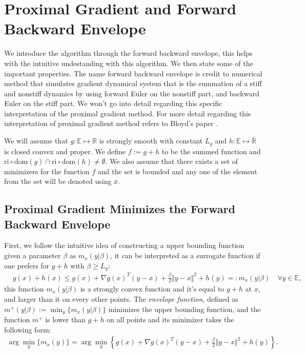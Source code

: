 \documentclass[]{article}
\theoremstyle{definition}
\begin{document}
\section{Proximal Gradient and Forward Backward Envelope}\label{sec:pg_forward_backward_env}
    We introduce the algorithm through the forward backward envelope, this helps with the intuitive undestanding with this algorithm. We then state some of the important properties. The name forward backward envelope is credit to numerical method that simulates gradient dynamical system that is the summation of a stiff and nonstiff dynamics by using forward Euler on the nonstiff part, and backward Euler on the stiff part. We won't go into detail regarding this specific interpretation of the proximal gradient method. For more detail regarding this interpretation of proximal gradient method refers to Bloyd's paper \cite{paper:bloyd}. 
    \begin{assumption}\label{assumption:1}
        We will assume that $g:\mathbb E\mapsto \mathbb R$ is strongly smooth with constant $L_g$ and $h:\mathbb E \mapsto \bar{\mathbb R}$ is closed convex and proper. We define $f := g + h$ to be the summed function and $\text{ri}\circ \text{dom}(g) \cap \text{ri}\circ \text{dom}(h) \neq \emptyset$. We also assume that there exists a set of minimizers for the function $f$ and the set is bounded and any one of the element from the set will be denoted using $\bar x$. 
    \end{assumption}
    
    \subsection{Proximal Gradient Minimizes the Forward Backward Envelope}
        First, we follow the intuitive idea of constructing a upper bounding function given a parameter $\beta$ as  $m_x(y|\beta)$, it can be interpreted as a surrogate function if one prefers for $g + h$ with $\beta \ge L_g$: 
        \begin{align*}
            & g(x) + h(x) \le 
            g(x) + \nabla g(x)^T(y - x) + \frac{\beta}{2} \Vert y - x\Vert^2
            + h(y) =: m_x(y|\beta) \quad \forall y \in \mathbb E, 
        \end{align*}
        this function $m_x(y|\beta)$ is a strongly convex function and it's equal to $g + h$ at $x$, and larger than it on every other points. The \emph{envelope function}, defined as $m^+(y|\beta):= \min_y \{m_x(y|\beta)\}$ minimizes the upper bounding function, and the function $m^+$ is lower than $g + h$ on all points and its minimizer takes the following form: 
        \begin{align*}
            \arg\min_{y} \{m_x(y)\} 
            = \arg\min_{y}\left\lbrace
                g(x) + \nabla g(x)^T(y - x) + \frac{\beta}{2}
                \Vert y - x\Vert^2 + h(y) 
            \right\rbrace. 
        \end{align*}
        
\end{document}

